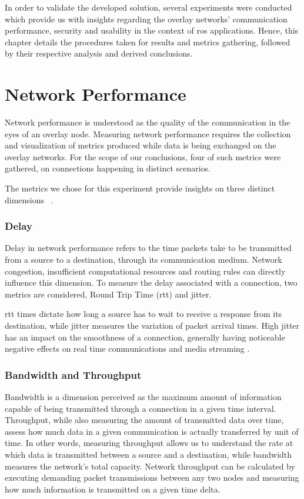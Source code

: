 \documentclass[11pt,twoside,a4paper]{report}
\begin{document}
In order to validate the developed solution, several experiments were conducted which provide us with insights regarding the overlay networks' communication performance, security and usability in the context of \ac{ros} applications. Hence, this chapter details the procedures taken for results and metrics gathering, followed by their respective analysis and derived conclusions.


\section{Network Performance}

Network performance is understood as the quality of the communication in the eyes of an overlay node. Measuring network performance requires the collection  and visualization of metrics produced while data is being exchanged on the overlay networks. For the scope of our conclusions, four of such metrics were gathered, on connections happening in distinct scenarios.

The metrics we chose for this experiment provide insights on three distinct dimensions ~\cite{Hanemann2006}.

\subsubsection{Delay}

Delay in network performance refers to the time packets take to be transmitted from a source to a destination, through its communication medium. Network congestion, insufficient computational resources and routing rules can directly influence this dimension. To measure the delay associated with a connection, two metrics are considered, Round Trip Time (\ac{rtt}) and jitter.

\ac{rtt} times dictate how long a source has to wait to receive a response from its destination, while jitter measures the variation of packet arrival times. High jitter has an impact on the smoothness of a connection, generally having noticeable negative effects on real time communications and media streaming \cite{claypool1999effects}.

\subsubsection{Bandwidth and Throughput}

Bandwidth is a dimension perceived as the maximum amount of information capable of being transmitted through a connection in a given time interval. Throughput, while also measuring the amount of transmitted data over time, assess how much data in a given communication is actually transferred by unit of time. In other words, measuring throughput allows us to understand the rate at which data is transmitted between a source and a destination, while bandwidth measures the network's total capacity. Network throughput can be calculated by executing demanding packet transmissions between any two nodes and measuring how much information is transmitted on a given time delta.
\end{document}
